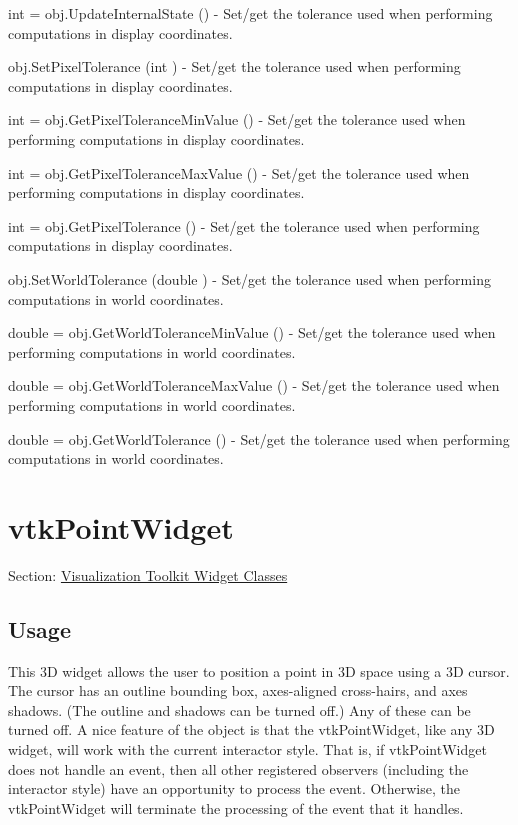 \begin{DoxyItemize}
\item {\ttfamily int = obj.\-Update\-Internal\-State ()} -\/ Set/get the tolerance used when performing computations in display coordinates.  
\item {\ttfamily obj.\-Set\-Pixel\-Tolerance (int )} -\/ Set/get the tolerance used when performing computations in display coordinates.  
\item {\ttfamily int = obj.\-Get\-Pixel\-Tolerance\-Min\-Value ()} -\/ Set/get the tolerance used when performing computations in display coordinates.  
\item {\ttfamily int = obj.\-Get\-Pixel\-Tolerance\-Max\-Value ()} -\/ Set/get the tolerance used when performing computations in display coordinates.  
\item {\ttfamily int = obj.\-Get\-Pixel\-Tolerance ()} -\/ Set/get the tolerance used when performing computations in display coordinates.  
\item {\ttfamily obj.\-Set\-World\-Tolerance (double )} -\/ Set/get the tolerance used when performing computations in world coordinates.  
\item {\ttfamily double = obj.\-Get\-World\-Tolerance\-Min\-Value ()} -\/ Set/get the tolerance used when performing computations in world coordinates.  
\item {\ttfamily double = obj.\-Get\-World\-Tolerance\-Max\-Value ()} -\/ Set/get the tolerance used when performing computations in world coordinates.  
\item {\ttfamily double = obj.\-Get\-World\-Tolerance ()} -\/ Set/get the tolerance used when performing computations in world coordinates.  
\end{DoxyItemize}\hypertarget{vtkwidgets_vtkpointwidget}{}\section{vtk\-Point\-Widget}\label{vtkwidgets_vtkpointwidget}
Section\-: \hyperlink{sec_vtkwidgets}{Visualization Toolkit Widget Classes} \hypertarget{vtkwidgets_vtkxyplotwidget_Usage}{}\subsection{Usage}\label{vtkwidgets_vtkxyplotwidget_Usage}
This 3\-D widget allows the user to position a point in 3\-D space using a 3\-D cursor. The cursor has an outline bounding box, axes-\/aligned cross-\/hairs, and axes shadows. (The outline and shadows can be turned off.) Any of these can be turned off. A nice feature of the object is that the vtk\-Point\-Widget, like any 3\-D widget, will work with the current interactor style. That is, if vtk\-Point\-Widget does not handle an event, then all other registered observers (including the interactor style) have an opportunity to process the event. Otherwise, the vtk\-Point\-Widget will terminate the processing of the event that it handles.

